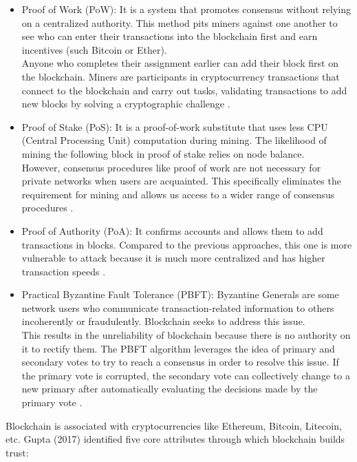 \begin{itemize}
    \item Proof of Work (PoW): 
    It is a system that promotes consensus without relying on a centralized authority. This method pits miners against one another to see who can enter their transactions into the blockchain first and earn incentives (such Bitcoin or Ether).\\
    Anyone who completes their assignment earlier can add their block first on the blockchain. Miners are participants in cryptocurrency transactions that connect to the blockchain and carry out tasks, validating transactions to add new blocks by solving a cryptographic challenge \cite{Pablo}.
    \item Proof of Stake (PoS): 
   It is a proof-of-work substitute that uses less CPU (Central Processing Unit) computation during mining. The likelihood of mining the following block in proof of stake relies on node balance. \\
    However, consensus procedures like proof of work are not necessary for private networks when users are acquainted. This specifically eliminates the requirement for mining and allows us access to a wider range of consensus procedures  \cite{Christidis}.
    \item Proof of Authority (PoA): It confirms accounts and allows them to add transactions in blocks. Compared to the previous approaches, this one is more vulnerable to attack because it is much more centralized and has higher transaction speeds \cite{Luke}.
    \item Practical Byzantine Fault Tolerance (PBFT): Byzantine Generals are some network users who communicate transaction-related information to others incoherently or fraudulently. Blockchain seeks to address this issue. \\
    This results in the unreliability of blockchain because there is no authority on it to rectify them. The PBFT algorithm leverages the idea of primary and secondary votes to try to reach a consensus in order to resolve this issue. If the primary vote is corrupted, the secondary vote can collectively change to a new primary after automatically evaluating the decisions made by the primary vote \cite{Luke}. 
\end{itemize}
Blockchain is associated with cryptocurrencies like Ethereum, Bitcoin, Litecoin, etc. Gupta (2017) \cite{Gupta} identified five core attributes through which blockchain builds trust:
